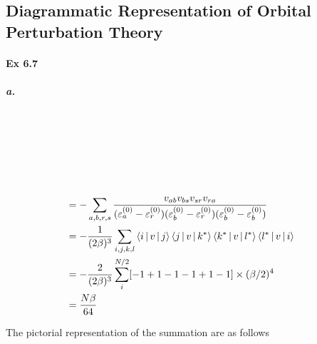\documentclass[a4paper]{article}
\newcommand{\ex}[1]{\paragraph{Ex #1}}
\newcommand{\subex}[1]{\subparagraph{#1}}
\numberwithin{equation}{subsection}
\begin{document}
\subsection{Diagrammatic Representation of Orbital Perturbation Theory}
\ex{6.7}
\subex{a.}
~\\
\begin{minipage}{0.2\linewidth}
		\hfill
	\\
	\vspace{25pt}\\
\end{minipage}
\begin{minipage}{0.8\linewidth}
	\vspace{25pt}~\\
	\begin{align}
	&= - \sum_{a,b,r,s} \dfrac{v_{ab}v_{bs}v_{sr}v_{ra}}{(\varepsilon_a^{(0)} - \varepsilon_r^{(0)})(\varepsilon_b^{(0)} - \varepsilon_r^{(0)})(\varepsilon_b^{(0)} - \varepsilon_b^{(0)})}  &\notag\\
	&= -\dfrac{1}{(2\beta)^3} \sum_{i,j,k,l} \Braket{i|v|j}\Braket{j|v|k^*}\Braket{k^*|v|l^*}\Braket{l^*|v|i} & \notag\\
	&= -\dfrac{2}{(2\beta)^3} \sum_i^{N/2} [-1 + 1 -1 -1 +1 -1]\times (\beta/2)^4  & \notag\\
	&= \dfrac{N\beta}{64}  & \notag\\
	\end{align}
\end{minipage}
The pictorial representation of the summation are as follows\\
\end{document}
